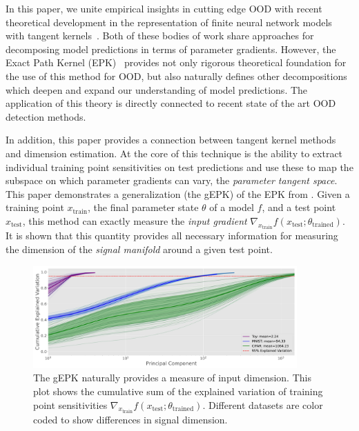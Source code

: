 In this paper, we unite empirical insights in cutting edge OOD with recent theoretical development in the representation of finite neural network models with tangent kernels~\citep{bell2023,chen2021equivalence,domingos2020}. 
Both of these bodies of work share approaches for decomposing model predictions in terms of parameter gradients. 
However, the Exact Path Kernel (EPK)~\citep{bell2023} provides not only rigorous theoretical foundation for the use of this method for OOD, but also naturally defines other decompositions which deepen and expand our understanding of model predictions. The application of this theory is directly connected to recent state of the art OOD detection methods.

In addition, this paper provides a connection between tangent kernel methods and dimension estimation. 
At the core of this technique is the ability to extract individual training point sensitivities on test predictions and use these to map the subspace on which parameter gradients can vary, the \emph{parameter tangent space}.
This paper demonstrates a generalization (the gEPK) of the EPK from
\citet{bell2023}. Given a training point $x_{\text{train}}$, the final parameter state $\theta$ of a model $f$, and a test point $x_{\text{test}}$, this
method can exactly measure the \emph{input gradient} $\nabla_{x_\text{train}}f(x_\text{test}; \theta_\text{trained})$.
It is shown that this quantity provides all necessary information for measuring the dimension of the \textit{signal manifold} \citep{srinivas2023} around a given test point.

\begin{figure}[t]
    \centering
    \includegraphics[width=0.9\textwidth]{c4a_figures/dimensionality_chords.pdf}
    \caption{The gEPK naturally provides a measure of input dimension. This plot shows the cumulative sum of the explained variation of training point sensitivities $\nabla_{x_\text{train}}f(x_\text{test}; \theta_\text{trained})$. Different datasets are color coded to show differences in signal dimension.  }
    \label{fig:cdf}
\end{figure}
 
